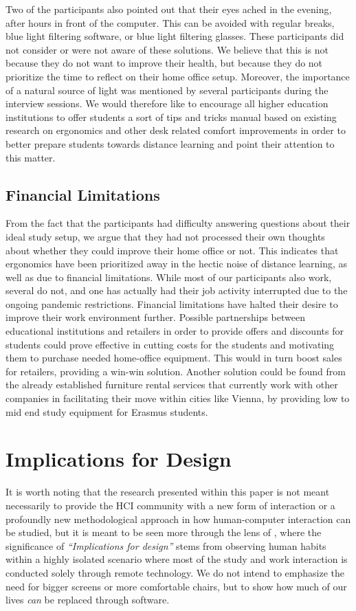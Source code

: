 \documentclass{sigchi}
\begin{document}
Two of the participants also pointed out that their eyes ached in the evening, after hours in front of the computer. This can be avoided with regular breaks, blue light filtering software, or blue light filtering glasses. These participants did not consider or were not aware of these solutions. We believe that this is not because they do not want to improve their health, but because they do not prioritize the time to reflect on their home office setup. Moreover, the importance of a natural source of light was mentioned by several participants during the interview sessions. We would therefore like to encourage all higher education institutions to offer students a sort of tips and tricks manual based on existing research on ergonomics and other desk related comfort improvements in order to better prepare students towards distance learning and point their attention to this matter.

\subsection{Financial Limitations}
From the fact that the participants had difficulty answering questions about their ideal study setup, we argue that they had not processed their own thoughts about whether they could improve their home office or not. This indicates that ergonomics have been prioritized away in the hectic noise of distance learning, as well as due to financial limitations. While most of our participants also work, several do not, and one has actually had their job activity interrupted due to the ongoing pandemic restrictions. Financial limitations have halted their desire to improve their work environment further. Possible partnerships between educational institutions and retailers in order to provide offers and discounts for students could prove effective in cutting costs for the students and motivating them to purchase needed home-office equipment. This would in turn boost sales for retailers, providing a win-win solution. Another solution could be found from the already established furniture rental services that currently work with other companies in facilitating their move within cities like Vienna, by providing low to mid end study equipment for Erasmus students.

\section{Implications for Design}

It is worth noting that the research presented within this paper is not meant necessarily to provide the HCI community with a new form of interaction or a profoundly new methodological approach in how human-computer interaction can be studied, but it is meant to be seen more through the lens of \cite{dourish_implications_2006}, where the significance of \emph{``Implications for design''} stems from observing human habits within a highly isolated scenario where most of the study and work interaction is conducted solely through remote technology. We do not intend to emphasize the need for bigger screens or more comfortable chairs, but to show how much of our lives \emph{can} be replaced through software.
\end{document}
